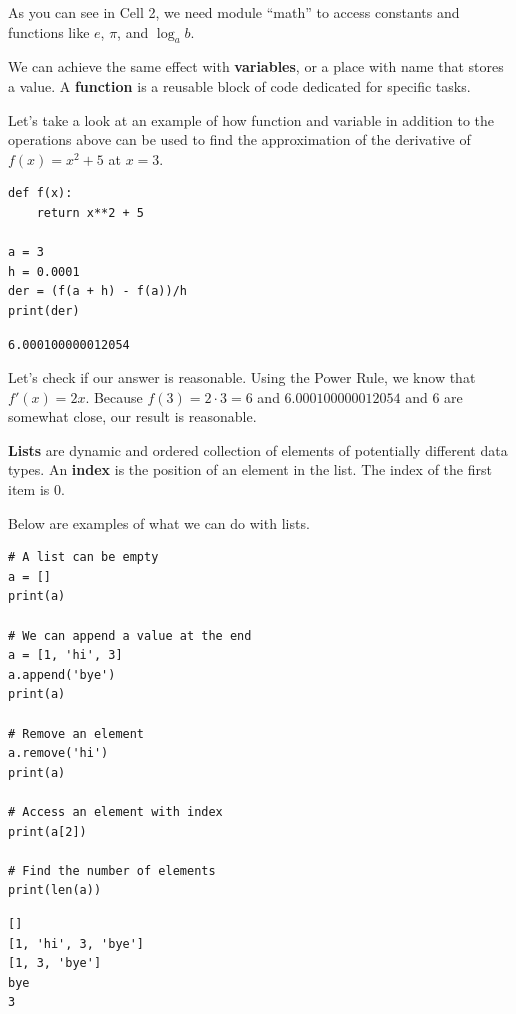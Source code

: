 \documentclass[../../main.tex]{subfiles}
\begin{document}
As you can see in Cell 2, we need module ``math'' to access
constants and functions like $e$, $\pi$, and $\log_a b$.

\begin{definition}{}{}
We can achieve the same effect with \textbf{variables}, or
a place with name that stores a value. A \textbf{function}
is a reusable block of code dedicated for specific tasks.
\end{definition}

Let's take a look at an example of how function and variable
in addition to the operations above can be used to find
the approximation of the derivative of $f(x) = x^2 + 5$
at $x = 3$.

\begin{jupyter}
\begin{lstlisting}[style=jin]
def f(x):
    return x**2 + 5

a = 3
h = 0.0001
der = (f(a + h) - f(a))/h
print(der)
\end{lstlisting}

\begin{lstlisting}[style=jout]
6.000100000012054
\end{lstlisting}
\end{jupyter}

Let's check if our answer is reasonable. Using the Power Rule,
we know that $f'(x) = 2x$. Because $f(3) = 2 \cdot 3 = 6$
and $6.000100000012054$ and $6$ are somewhat close, our result
is reasonable.

\begin{definition}{}{}
\textbf{Lists} are dynamic and ordered collection of elements
of potentially different data types. An \textbf{index} is the
position of an element in the list. The index of the first item
is $0$.
\end{definition}

Below are examples of what we can do with lists.

\begin{jupyter}
\begin{lstlisting}[style=jin]
# A list can be empty
a = []
print(a)

# We can append a value at the end
a = [1, 'hi', 3]
a.append('bye')
print(a)

# Remove an element
a.remove('hi')
print(a)

# Access an element with index
print(a[2])

# Find the number of elements
print(len(a))
\end{lstlisting}

\begin{lstlisting}[style=jout]
[]
[1, 'hi', 3, 'bye']
[1, 3, 'bye']
bye
3
\end{lstlisting}
\end{jupyter}
\end{document}
